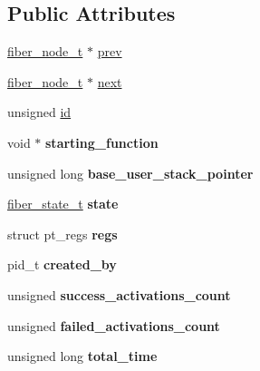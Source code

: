 \subsection*{Public Attributes}
\begin{DoxyCompactItemize}
\item 
\mbox{\hyperlink{core_8h_adb14c8b48a1d56cf9c6632295ab90048}{fiber\+\_\+node\+\_\+t}} $\ast$ \mbox{\hyperlink{structfiber_a327a77d565b2e0054f97b057e55b2178}{prev}}
\item 
\mbox{\hyperlink{core_8h_adb14c8b48a1d56cf9c6632295ab90048}{fiber\+\_\+node\+\_\+t}} $\ast$ \mbox{\hyperlink{structfiber_a8edc01f505460ec3df1f5319d26ee0cd}{next}}
\item 
unsigned \mbox{\hyperlink{structfiber_a6301190065f177d47b2d74fa1d1240c0}{id}}
\item 
\mbox{\label{structfiber_a614a5ee08f9f0afe7f0b14b7fdb22437}} 
void $\ast$ {\bfseries starting\+\_\+function}
\item 
\mbox{\label{structfiber_a3cf689305251f7117a3a91805f8ad729}} 
unsigned long {\bfseries base\+\_\+user\+\_\+stack\+\_\+pointer}
\item 
\mbox{\label{structfiber_a4ea650b723a810af6832f697a0de7e99}} 
\mbox{\hyperlink{core_8h_a707fd6f68415e6978adb340746527715}{fiber\+\_\+state\+\_\+t}} {\bfseries state}
\item 
\mbox{\label{structfiber_ae29b11c431ae8c5aa8e0c1e9027b28f2}} 
struct pt\+\_\+regs {\bfseries regs}
\item 
\mbox{\label{structfiber_adc6e3e51fa77df35cc927f1c088cee4e}} 
pid\+\_\+t {\bfseries created\+\_\+by}
\item 
\mbox{\label{structfiber_a1e8bfeeac1b424ed9934df75aa294141}} 
unsigned {\bfseries success\+\_\+activations\+\_\+count}
\item 
\mbox{\label{structfiber_ac47ac73fa0666a3c6b2f7abe4963bc32}} 
unsigned {\bfseries failed\+\_\+activations\+\_\+count}
\item 
\mbox{\label{structfiber_ac20c19c4679f14d5abad539853c42bc3}} 
unsigned long {\bfseries total\+\_\+time}
\end{DoxyCompactItemize}


